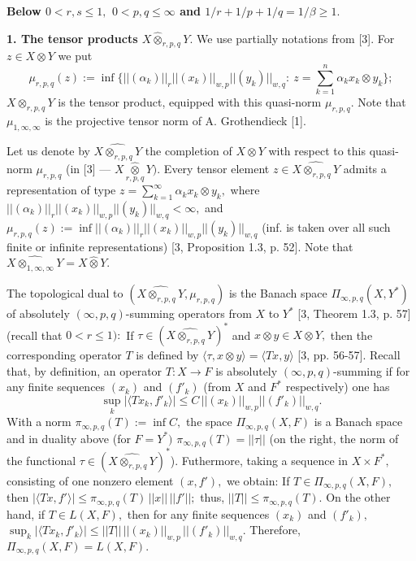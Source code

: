    {\bf Below $0<r, s\leqslant1,$ $0< p,q \leqslant\infty$ and $1/r+1/p+1/q=1/\beta\geqslant1.$}


      \medskip

       {\bf 1. The tensor products $X\widehat\otimes_{r,p,q} Y.$}
       We use partially nota\-ti\-ons from [3].
   For $z\in X\otimes Y$ we put
  $$\mu_{r,p,q}(z):= \inf\{||(\alpha_k)||_r ||(x_k)||_{w,p} ||(y_k)||_{w,q}:\
  z=\sum_{k=1}^n \alpha_k x_k\otimes y_k\};$$
$X\otimes_{r,p,q} Y$ is the tensor product, equipped with this quasi-norm $\mu_{r,p,q}.$
Note that $\mu_{1,\infty,\infty}$ is the projective tensor norm of A. Grothendieck [1].

Let us denote by $\widehat{X\otimes_{r,p,q} Y}$ the completion of $X\otimes Y$ with respect to
this quasi-norm $\mu_{r,p,q}$ (in [3] --- $X\underset{r,p,q}{\widehat\otimes} Y).$
Every tensor element $z\in \widehat{X\otimes_{r,p,q} Y}$
admits a representation of type
$z= \sum_{k=1}^\infty \alpha_k x_k\otimes y_k,$
where $||(\alpha_k)||_r ||(x_k)||_{w,p} ||(y_k)||_{w,q}<\infty,$ and
$\mu_{r,p,q}(z):= \inf ||(\alpha_k)||_r ||(x_k)||_{w,p} ||(y_k)||_{w,q}$
(inf. is taken over all such finite or infinite representations) [3, Proposition 1.3, p. 52].
Note that $\widehat{X\otimes_{1,\infty,\infty} Y}= X\widehat\otimes Y.$

The topological dual to $(\widehat{X\otimes_{r,p,q} Y}, \mu_{r,p,q})$ is the Banach space
$\Pi_{\infty,p,q}(X,Y^*)$ of absolutely $(\infty,p,q)$-summing operators
from $X$ to $Y^*$ [3, Theorem 1.3, p. 57]
(recall that $0<r\leqslant1):$ If $\tau\in (\widehat{X\otimes_{r,p,q} Y})^*$ and
$x\otimes y\in X\otimes Y,$ then the corresponding operator $T$
is defined by $\langle \tau, x\otimes y\rangle= \langle Tx, y\rangle$ [3, pp. 56-57].
Recall that, by definition, an operator $T: X\to F$ is
absolutely $(\infty,p,q)$-summing if for any finite sequences
$(x_k)$ and $(f'_k)$ (from $X$ and $F^*$ respectively) one has
$$ \sup_k |\langle Tx_k, f'_k\rangle|\leqslant C\, ||(x_k)||_{w,p} ||(f'_k)||_{w,q}.
$$
With a norm $\pi_{\infty,p,q}(T):= \inf C,$ the space
 $\Pi_{\infty,p,q}(X, F)$ is a Banach space and in duality above (for $F=Y^*)$
 $\pi_{\infty,p,q}(T)= ||\tau||$ (on the right, the norm of the functional
  $\tau\in(\widehat{X\otimes_{r,p,q} Y})^*$).
 Futhermore, taking a sequence in $X\times F^*,$ consisting of one nonzero element
 $(x,f'),$ we obtain: If $T\in \Pi_{\infty,p,q}(X, F),$ then
 $|\langle Tx, f'\rangle|\leqslant \pi_{\infty,p,q}(T)\, ||x||\, ||f'||;$
 thus, $||T||\leqslant \pi_{\infty,p,q}(T).$
  On the other hand, if $T\in L(X,F),$ then
for any finite sequences $(x_k)$ and $(f'_k),$ \,
$\sup_k |\langle Tx_k, f'_k\rangle|\leqslant
 ||T||\, ||(x_k)||_{w,p}\, ||(f'_k)||_{w,q}.$
 There\-fo\-re,
 $\Pi_{\infty,p,q}(X, F)= L(X, F).$

